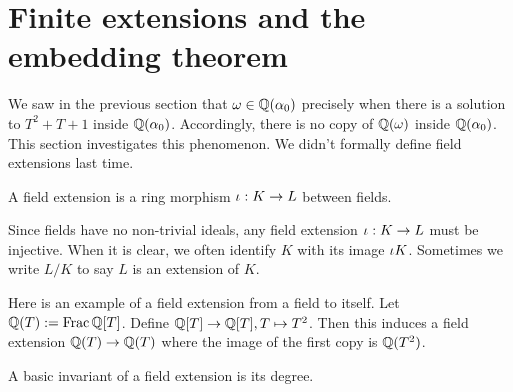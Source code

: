\documentclass{article}
\begin{document}

\section{Finite extensions and the embedding theorem}

We saw in the previous section that 
$\omega \in \mathbb{Q}(\alpha_0)$ precisely when there is a solution to $T^2 + T + 1$
inside $\mathbb{Q}(\alpha_0)$.
Accordingly, there is no copy of $\mathbb{Q}(\omega)$ inside $\mathbb{Q}(\alpha_0)$.
This section investigates this phenomenon.
We didn't formally define field extensions last time.

\begin{dfn}
  A field extension is a ring morphism $\iota : K \to L$ between fields.
  
  Since fields have no non-trivial ideals,
  any field extension $\iota : K \to L$ must be injective.
  When it is clear, we often identify $K$ with its image $\iota K$.
  Sometimes we write $L / K$ to say $L$ is an extension of $K$.
\end{dfn}

\begin{eg}
  Here is an example of a field extension from a field to itself.
  Let $\mathbb{Q}(T) := \mathrm{Frac}\,\mathbb{Q}[T]$.
  Define $\mathbb{Q}[T] \to \mathbb{Q}[T] , T \mapsto T^2$.
  Then this induces a field extension $\mathbb{Q}(T) \to \mathbb{Q}(T)$
  where the image of the first copy is $\mathbb{Q}(T^2)$.
\end{eg}

A basic invariant of a field extension is its degree.
\end{document}
